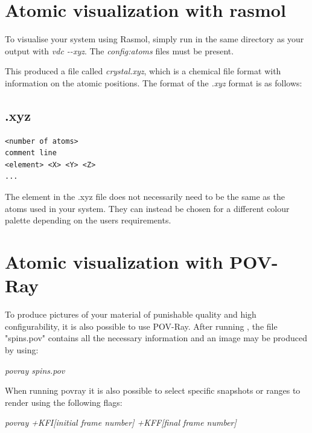 \section*{Atomic visualization with rasmol}

To visualise your system using Rasmol, simply run \vdc in the same directory as
your output with \textit{vdc -{}-xyz}. The \textit{config:atoms} files must be
present.

This produced a file called \textit{crystal.xyz}, which is a chemical file
format with information on the atomic positions. The format of the \textit{.xyz}
format is as follows:

\subsection*{.xyz}
{\footnotesize
\begin{verbatim}
<number of atoms>
comment line
<element> <X> <Y> <Z>
...
\end{verbatim}
}

The element in the .xyz file does not necessarily need to be the same as the
atoms used in your system. They can instead be chosen for a different colour
palette depending on the users requirements.

\section*{Atomic visualization with POV-Ray}

To produce pictures of your material of punishable quality and high
configurability, it is also possible to use POV-Ray. After running \vdc, the
file "spins.pov" contains all the necessary information and an image may be
produced by using:

\noindent
\begin{minipage}[c]{\textwidth}
\centering
\textit{povray spins.pov}
\end{minipage}

When running povray it is also possible to select specific snapshots or ranges
to render using the following flags:

\noindent
\begin{minipage}[c]{\textwidth}
\centering
\textit{povray +KFI[initial frame number] +KFF[final frame number]}
\end{minipage}


